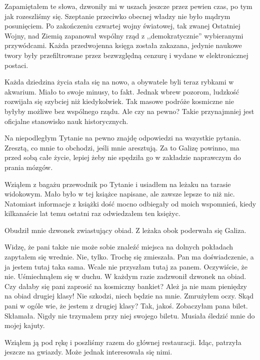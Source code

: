 Zapamiętałem te słowa, dzwoniły mi w uszach jeszcze przez pewien czas, po tym jak rozeszliśmy się.
Szeptanie przeciwko obecnej władzy nie było mądrym posunięciem.
Po zakończeniu czwartej wojny światowej, tak zwanej Ostatniej Wojny, nad Ziemią zapanował wspólny rząd z ,,demokratycznie'' wybieranymi przywódcami.
Każda przedwojenna księga została zakazana, jedynie naukowe twory były przefiltrowane przez bezwzględną cenzurę i wydane w elektronicznej postaci.

Każda dziedzina życia stała się na nowo, a obywatele byli teraz rybkami w akwarium.
Miało to swoje minusy, to fakt.
Jednak wbrew pozorom, ludzkość rozwijała się szybciej niż kiedykolwiek.
Tak masowe podróże kosmiczne nie byłyby możliwe bez wspólnego rządu.
Ale czy na pewno? Takie przynajmniej jest oficjalne stanowisko nauk historycznych.

Na niepodległym Tytanie na pewno znajdę odpowiedzi na wszystkie pytania.
Zresztą, co mnie to obchodzi, jeśli mnie aresztują.
Za to Galizę powinno, ma przed sobą całe życie, lepiej żeby nie spędziła go w zakładzie naprawczym do prania mózgów.

Wziąłem z bagażu przewodnik po Tytanie i usiadłem na leżaku na tarasie widokowym.
Mało było w tej książce napisane, ale zawsze lepsze to niż nic.
Natomiast informacje z książki dość mocno odbiegały od moich wspomnień, kiedy kilkanaście lat temu ostatni raz odwiedzałem ten księżyc.

Obudził mnie dzwonek zwiastujący obiad.
Z leżaka obok poderwała się Galiza.

\begin{dialogue}
	\ds{} Widzę, że pani także nie może sobie znaleźć miejsca na dolnych pokładach \dm{} zapytałem się wrednie.
	\ds{} Nie, tylko. \dm{} Trochę się zmieszała. \dm{} Pan ma doświadczenie, a ja jestem tutaj taka sama. Wcale nie przyszłam tutaj za panem.
	\ds{} Oczywiście, że nie. \dm{} Uśmiechnąłem się w duchu. \dm{} W każdym razie zadzwonił dzwonek na obiad. Czy dałaby się pani zaprosić na kosmiczny bankiet?
	\ds{} Ależ ja nie mam pieniędzy na obiad drugiej klasy!
	\ds{} Nie szkodzi, niech będzie na mnie. \dm{} Zmrużyłem oczy. \dm{} Skąd pani w ogóle wie, że jestem z drugiej klasy?
	\ds{} Tak, jakoś. Zobaczyłam pana bilet. \dm{} Skłamała. Nigdy nie trzymałem przy niej swojego biletu. Musiała śledzić mnie do mojej kajuty.
\end{dialogue}

Wziąłem ją pod rękę i poszliśmy razem do głównej restauracji.
Idąc, patrzyła jeszcze na gwiazdy.
Może jednak interesowała się nimi.

